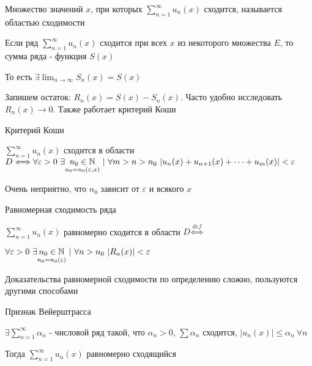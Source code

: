 \documentclass[12pt]{article}
\begin{document}
    \Def Множество значений $x$, при которых $\sum_{n = 1}^\infty u_n(x)$ сходится, называется областью сходимости

    \hypertarget{functionalseriesconvergence}{}

    \Defs Если ряд $\sum_{n = 1}^\infty u_n(x)$ сходится при всех $x$ из некоторого множества $E$, то сумма ряда -
    функция $S(x)$

    \Nota То есть $\exists \lim_{n \to \infty} S_n(x) = S(x)$

    Запишем остаток: $R_n(x) = S(x) - S_n(x)$. Часто удобно исследовать $R_n(x) \to 0$. Также работает критерий Коши

    \begin{MyTheorem}
        \Ths Критерий Коши

        $\sum_{n = 1}^\infty u_n(x)$ сходится в области $D \Longleftrightarrow
        \forall \varepsilon > 0 \ \exists \underset{n_0 = n_0(\varepsilon, x)}{n_0 \in \mathbb{N}} \ | \
        \forall m > n > n_0 \ |u_n(x) + u_{n + 1}(x) + \dots + u_m(x)| < \varepsilon$
    \end{MyTheorem}

    \Notas Очень неприятно, что $n_0$ зависит от $\varepsilon$ и всякого $x$

    \hypertarget{uniformconvergence}{}

    \Def Равномерная сходимость ряда

    $\sum_{n = 1}^\infty u_n(x)$ равномерно сходится в области $D \overset{def}{\Longleftrightarrow}$

    $\forall \varepsilon > 0 \ \exists \underset{n_0 = n_0(\varepsilon)}{n_0 \in \mathbb{N}} \ | \ \forall n > n_0 \ |R_n(x)| < \varepsilon$

    \Nota Доказательства равномерной сходимости по определению сложно, пользуются другими способами

    \hypertarget{weierstrassign}{}

    \begin{MyTheorem}
        \Ths Признак Вейерштрасса

        $\exists \sum_{n = 1}^\infty \alpha_n$ - числовой ряд такой, что $\alpha_n > 0$, $\sum \alpha_n$ сходится,
        $|u_n(x)| \leq \alpha_n \ \forall n$

        Тогда $\sum_{n = 1}^\infty u_n(x)$ равномерно сходящийся

    \end{MyTheorem}

    \hypertarget{majorseries}{}
\end{document}
